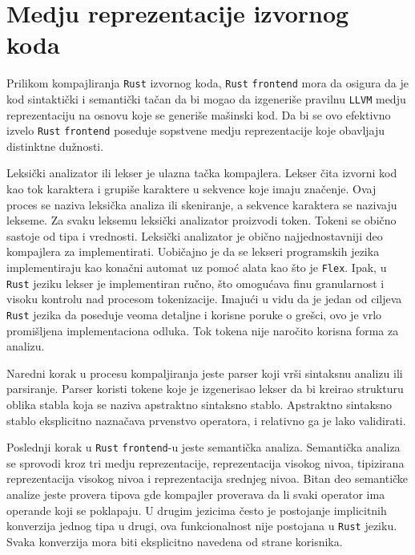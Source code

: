 \section{Medju reprezentacije izvornog koda}

Prilikom kompajliranja \verb|Rust| izvornog koda, \verb|Rust| \verb|frontend| mora da osigura da je 
kod sintaktički i semantički tačan da bi mogao da izgeneriše pravilnu \verb|LLVM| medju reprezentaciju 
na osnovu koje se generiše mašinski kod. Da bi se ovo efektivno izvelo \verb|Rust| \verb|frontend| poseduje 
sopstvene medju reprezentacije koje obavljaju distinktne dužnosti. 

Leksički analizator ili lekser je ulazna tačka kompajlera. Lekser čita izvorni kod kao tok karaktera i grupiše karaktere 
u sekvence koje imaju značenje. Ovaj proces se naziva leksička analiza ili skeniranje, a sekvence karaktera se nazivaju lekseme. 
Za svaku leksemu leksički analizator proizvodi token. Tokeni se obično sastoje od tipa i vrednosti.
Leksički analizator je obično najjednostavniji deo kompajlera za implementirati. 
Uobičajno je da se lekseri programskih jezika implementiraju kao konačni automat uz pomoć alata kao što 
je \verb|Flex|. Ipak, u \verb|Rust| jeziku lekser je implementiran ručno, što omogućava finu granularnost 
i visoku kontrolu nad procesom tokenizacije. Imajući u vidu da je jedan od ciljeva \verb|Rust| jezika 
da poseduje veoma detaljne i korisne poruke o grešci, ovo je vrlo promišljena implementaciona odluka. 
Tok tokena nije naročito korisna forma za analizu.

Naredni korak u procesu kompaljiranja jeste parser koji vrši sintaksnu analizu ili parsiranje. 
Parser koristi tokene koje je izgenerisao lekser da bi kreirao strukturu oblika stabla koja se naziva 
apstraktno sintaksno stablo. Apstraktno sintaksno stablo eksplicitno naznačava prvenstvo operatora,
i relativno ga je lako validirati.

Poslednji korak u \verb|Rust| \verb|frontend|-u jeste semantička analiza. Semantička analiza se sprovodi 
kroz tri medju reprezentacije, reprezentacija visokog nivoa, tipizirana reprezentacija visokog nivoa
i reprezentacija srednjeg nivoa. Bitan deo semantičke analize jeste provera tipova gde kompajler proverava 
da li svaki operator ima operande koji se poklapaju. U drugim jezicima često je postojanje implicitnih 
konverzija jednog tipa u drugi, ova funkcionalnost nije postojana u \verb|Rust| jeziku. Svaka konverzija 
mora biti eksplicitno navedena od strane korisnika.

